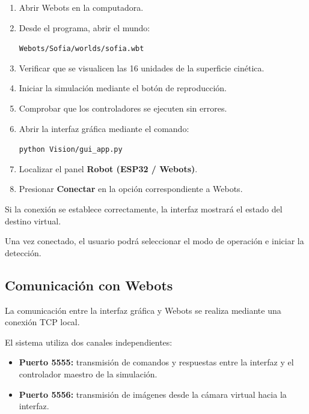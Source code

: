\documentclass[letterpaper,journal]{IEEEtran}
\begin{document}
\begin{enumerate}
    \item Abrir Webots en la computadora.

    \item Desde el programa, abrir el mundo:

    \texttt{Webots/Sofia/worlds/sofia.wbt}

    \item Verificar que se visualicen las
    16 unidades de la superficie cinética.

    \item Iniciar la simulación mediante
    el botón de reproducción.

    \item Comprobar que los controladores
    se ejecuten sin errores.

    \item Abrir la interfaz gráfica
    mediante el comando:

    \texttt{python Vision/gui\_app.py}

    \item Localizar el panel
    \textbf{Robot (ESP32 / Webots)}.

    \item Presionar \textbf{Conectar}
    en la opción correspondiente a Webots.
\end{enumerate}

Si la conexión se establece correctamente,
la interfaz mostrará el estado del
destino virtual.

Una vez conectado, el usuario podrá
seleccionar el modo de operación
e iniciar la detección.

\subsection{Comunicación con Webots}

La comunicación entre la interfaz gráfica
y Webots se realiza mediante una conexión
TCP local.

El sistema utiliza dos canales
independientes:

\begin{itemize}
    \item \textbf{Puerto 5555:}
    transmisión de comandos y respuestas
    entre la interfaz y el controlador
    maestro de la simulación.

    \item \textbf{Puerto 5556:}
    transmisión de imágenes desde
    la cámara virtual hacia la interfaz.
\end{itemize}
\end{document}
